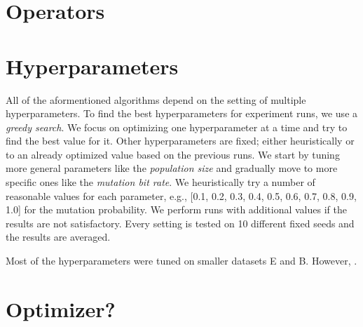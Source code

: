 \section{Operators}

\section{Hyperparameters}

All of the aformentioned algorithms depend on the setting of multiple hyperparameters. To find the best hyperparameters for experiment runs, we use a \textit{greedy search}. We focus on optimizing one hyperparameter at a time and try to find the best value for it. Other hyperparameters are fixed; either heuristically or to an already optimized value based on the previous runs. We start by tuning more general parameters like the \textit{population size} and gradually move to more specific ones like the \textit{mutation bit rate}. We heuristically try a number of reasonable values for each parameter, e.g., [0.1, 0.2, 0.3, 0.4, 0.5, 0.6, 0.7, 0.8, 0.9, 1.0] for the mutation probability. We perform runs with additional values if the results are not satisfactory. Every setting is tested on 10 different fixed seeds and the results are averaged.

Most of the hyperparameters were tuned on smaller datasets E and B. However, .

\section{Optimizer?}
